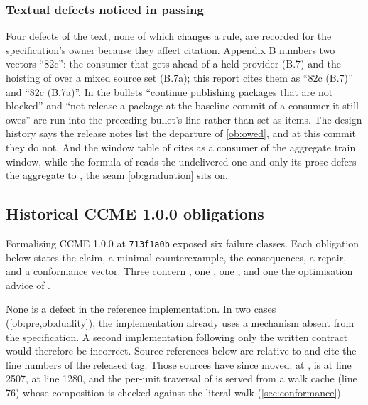 \subsubsection{Textual defects noticed in passing}

Four defects of the text, none of which changes a rule, are recorded for the
specification's owner because they affect citation. Appendix B numbers two
vectors ``82c'': the consumer that gets ahead of a held provider (B.7) and
the hoisting of  over a mixed source set (B.7a); this
report cites them as ``82c (B.7)'' and ``82c (B.7a)''. In  the
bullets ``continue publishing packages that are not blocked'' and ``not
release a package at the baseline commit of a consumer it still owes'' are
run into the preceding bullet's line rather than set as items. The design
history says the release notes list the departure of \cref{ob:owed}, and at
this commit they do not. And the window table of  cites
 as a consumer of the aggregate train window, while the formula
of  reads the undelivered one and only its prose defers the
aggregate to , the seam \cref{ob:graduation} sits on.

\subsection{Historical CCME 1.0.0 obligations}
\label{sec:obligations-historical}

Formalising CCME 1.0.0 at \texttt{713f1a0b} exposed six failure classes. Each obligation below
states the claim, a minimal counterexample, the consequences, a repair, and a
conformance vector. Three concern , one , one
, and one the optimisation advice of .

None is a defect in the reference implementation. In two cases
(\cref{ob:pre,ob:duality}), the implementation already uses a mechanism absent
from the specification. A second implementation following only the written
contract would therefore be incorrect. Source references below are
relative to  and cite the line numbers of
the released  tag. Those sources have since
moved: at ,  is at 
line 2507,  at line 1280, and the per-unit traversal
of  is served from a walk cache (line 76) whose
composition is checked against the literal walk (\cref{sec:conformance}).

